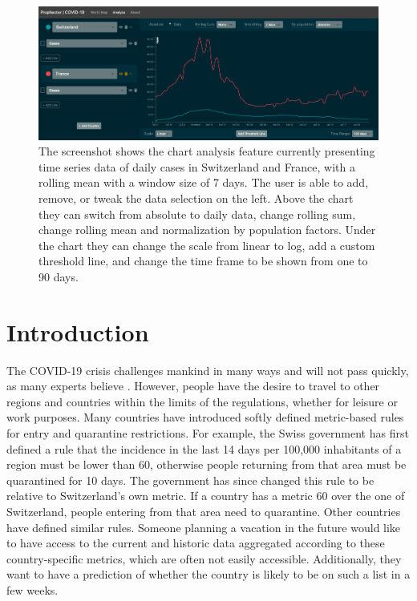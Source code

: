 
\begin{figure}[htbp]
\centerline{\includegraphics[scale=.328]{figs/screenshot-chart.png}}
\caption{The screenshot shows the chart analysis feature currently presenting time series data of daily cases in Switzerland and France, with a rolling mean with a window size of 7 days. The user is able to add, remove, or tweak the data selection on the left. Above the chart they can switch from absolute to daily data, change rolling sum, change rolling mean and normalization by population factors. Under the chart they can change the scale from linear to log, add a custom threshold line, and change the time frame to be shown from one to 90 days.}
\label{fig:screenshot-chart}
\end{figure}


\section{Introduction}
The COVID-19 crisis challenges mankind in many ways and will not pass quickly, as many experts believe \cite{b6}. However, people have the desire to travel to other regions and countries within the limits of the regulations, whether for leisure or work purposes. Many countries have introduced softly defined metric-based rules for entry and quarantine restrictions. For example, the Swiss government has first defined a rule that the incidence in the last 14 days per 100,000 inhabitants of a region must be lower than 60, otherwise people returning from that area must be quarantined for 10 days. The government has since changed this rule to be relative to Switzerland's own metric. If a country has a metric 60 over the one of Switzerland, people entering from that area need to quarantine. Other countries have defined similar rules. Someone planning a vacation in the future would like to have access to the current and historic data aggregated according to these country-specific metrics, which are often not easily accessible. Additionally, they want to have a prediction of whether the country is likely to be on such a list in a few weeks.

